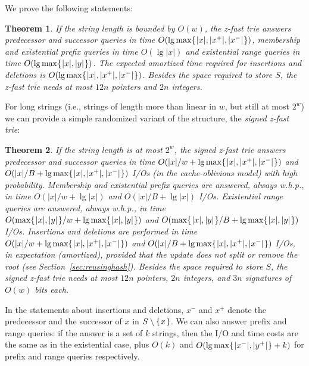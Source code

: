 \documentclass[a4paper]{article}
\newtheorem{theorem}{Theorem}
\newcommand{\?}{\mskip1.5mu}
\begin{document}
We prove the following statements:
\begin{theorem}
\label{th:bounds}
If the string length is bounded by $O(w)$, the z-fast trie answers
predecessor and successor queries in time $O(\lg\max\{\?|x|,|x^+|,|x^-|\?\})$,
membership and existential prefix queries in time $O(\lg|x|)$ and existential range queries in
time $O(\lg\max\{\?|x|,|y|\?\})$. The expected amortized time required for insertions and deletions is 
$O(\lg\max\{\?|x|,|x^+|,|x^-|\?\})$. Besides the space 
required to store $S$, the z-fast trie needs at most $12n$ pointers and $2n$ integers.
\end{theorem}
For long strings (i.e., strings of length more than linear in $w$, but still at most $2^w$) we can
provide a simple randomized variant of the structure, the \emph{signed z-fast
trie}:
\begin{theorem}
\label{th:boundslong}
If the string length is at most $2^w$, the signed z-fast trie
answers predecessor and successor queries in time
$O(|x|/w + \lg\max\{\?|x|,|x^+|,|x^-|\?\})$ and $O(|x|/B +
\lg\max\{\?|x|,|x^+|,|x^-|\?\})$ I/Os (in the cache-oblivious model) \emph{with
high probability}. Membership and existential prefix queries are answered, always w.h.p., in time 
$O(|x|/w + \lg|x|)$ and $O(|x|/B + \lg|x|)$ I/Os.
Existential range queries are answered, always w.h.p., in time 
$O(\max\{\?|x|,|y|\?\}/w + \lg\max\{\?|x|,|y|\?\})$ and
$O(\max\{\?|x|,|y|\?\}/B + \lg\max\{\?|x|,|y|\?\})$ I/Os. Insertions and deletions are
performed in time $O(|x|/w+\lg\max\{\?|x|,|x^+|,|x^-|\?\})$ and
$O(|x|/B+\lg\max\{\?|x|,|x^+|,|x^-|\?\})$ I/Os, in expectation (amortized), provided that the update does not split or remove the root
(see Section~\ref{sec:reusinghash}). 
Besides the space required to store
$S$, the signed z-fast trie needs at most $12n$ pointers, $2n$ integers, and $3n$
signatures of $O(w)$ bits each.
\end{theorem}
In the statements about insertions and deletions, $x^-$ and $x^+$ denote the predecessor and
the successor of $x$ in $S\setminus\{\?x\?\}$.
We can also answer prefix and range queries: if the answer is a set of $k$ 
strings, then the I/O and time costs are the same as in the existential
case, plus $O(k)$ and $O(\lg\max\{\?|x^-|,|y^+|\?\} + k)$ for prefix and
range queries respectively. 
\end{document}
